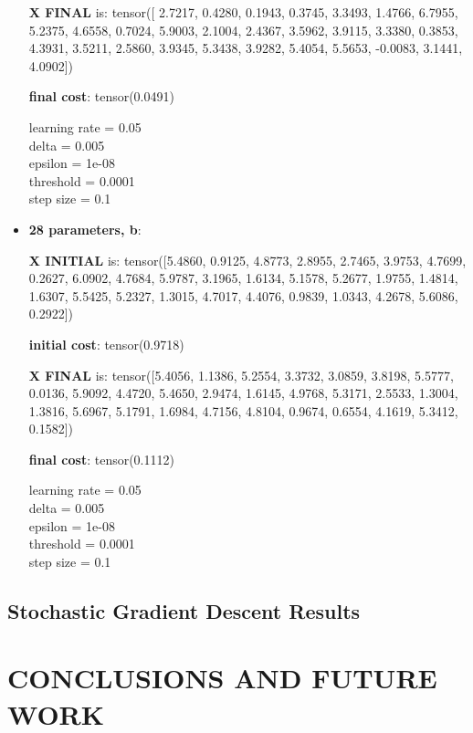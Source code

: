 \documentclass[inscr,ack,preface]{diphdthesis}
\begin{document}
\begin{itemize}
\textbf{X FINAL} is:
tensor([ 2.7217,  0.4280,  0.1943,  0.3745,  3.3493,  1.4766,  6.7955,  5.2375,
         4.6558,  0.7024,  5.9003,  2.1004,  2.4367,  3.5962,  3.9115,  3.3380,
         0.3853,  4.3931,  3.5211,  2.5860,  3.9345,  5.3438,  3.9282,  5.4054,
         5.5653, -0.0083,  3.1441,  4.0902])

\textbf{final cost}: tensor(0.0491)

learning rate =  0.05 \\
delta =  0.005 \\
epsilon =  1e-08 \\
threshold =  0.0001\\ 
step size =  0.1 \\

\item \textbf{28 parameters,  b}: 

\textbf{X INITIAL}  is:
 tensor([5.4860, 0.9125, 4.8773, 2.8955, 2.7465, 3.9753, 4.7699, 0.2627, 6.0902,
        4.7684, 5.9787, 3.1965, 1.6134, 5.1578, 5.2677, 1.9755, 1.4814, 1.6307,
        5.5425, 5.2327, 1.3015, 4.7017, 4.4076, 0.9839, 1.0343, 4.2678, 5.6086,
        0.2922])
        
\textbf{initial cost}: tensor(0.9718)

\textbf{X FINAL} is:
 tensor([5.4056, 1.1386, 5.2554, 3.3732, 3.0859, 3.8198, 5.5777, 0.0136, 5.9092,
        4.4720, 5.4650, 2.9474, 1.6145, 4.9768, 5.3171, 2.5533, 1.3004, 1.3816,
        5.6967, 5.1791, 1.6984, 4.7156, 4.8104, 0.9674, 0.6554, 4.1619, 5.3412,
        0.1582])

\textbf{final cost}: tensor(0.1112)

learning rate =  0.05 \\
delta =  0.005 \\
epsilon =  1e-08 \\
threshold =  0.0001\\ 
step size =  0.1 \\

\end{itemize}

\section{Stochastic Gradient Descent Results}

\chapter{CONCLUSIONS AND FUTURE WORK}
\end{document}

